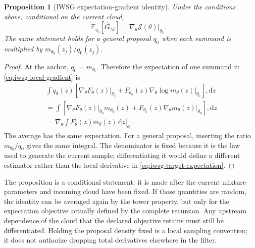 \documentclass[11pt]{article}
\newtheorem{proposition}{Proposition}
\newcommand{\dd}{\mathrm{d}}
\begin{document}
\begin{proposition}[IWSG expectation-gradient identity]
\label{prop:iwsg-expectation-gradient}
Under the conditions above, conditional on the current cloud,
\begin{equation}
 \mathbb E_{q_0}[\widehat G_M]
 =\left.\nabla_\theta\mathcal J(\theta)\right|_{\theta_0}.
 \label{eq:iwsg-unbiased-expectation-gradient}
\end{equation}
The same statement holds for a general proposal $q_0$ when each summand is
multiplied by $m_{\theta_0}(z_j)/q_0(z_j)$.
\end{proposition}

\begin{proof}
At the anchor, $q_0=m_{\theta_0}$. Therefore the expectation of one summand
in \eqref{eq:iwsg-local-gradient} is
\begin{align*}
 &\int q_0(z)\left[
      \left.\nabla_\theta F_\theta(z)\right|_{\theta_0}
      +F_{\theta_0}(z)
       \left.\nabla_\theta\log m_\theta(z)\right|_{\theta_0}
    \right],\dd z \\
 &=\int\left[
      \left.\nabla_\theta F_\theta(z)\right|_{\theta_0}m_{\theta_0}(z)
      +F_{\theta_0}(z)
       \left.\nabla_\theta m_\theta(z)\right|_{\theta_0}
    \right],\dd z \\
 &=\left.\nabla_\theta\int F_\theta(z)m_\theta(z)\,\dd z\right|_{\theta_0}.
\end{align*}
The average has the same expectation. For a general proposal, inserting the
ratio $m_{\theta_0}/q_0$ gives the same integral. The denominator is fixed
because it is the law used to generate the current sample; differentiating it
would define a different estimator rather than the local derivative in
\eqref{eq:iwsg-target-expectation}.
\end{proof}

The proposition is a conditional statement: it is made after the current
mixture parameters and incoming cloud have been fixed. If those quantities
are random, the identity can be averaged again by the tower property, but
only for the expectation objective actually defined by the complete
recursion. Any upstream dependence of the cloud that the declared objective
retains must still be differentiated. Holding the proposal density fixed is a
local sampling convention; it does not authorize dropping total derivatives
elsewhere in the filter.
\end{document}
